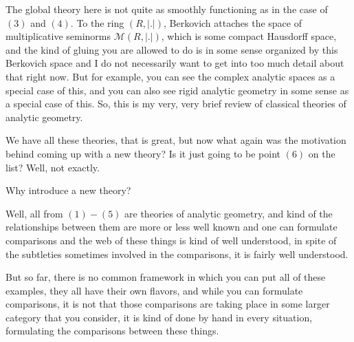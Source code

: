 The global theory here is not quite as smoothly functioning as in the case of $(3)$ and $(4)$. To the ring $(R, |.|)$, Berkovich 
attaches the space of multiplicative seminorms $\mathcal{M}(R, |.|)$, which is some compact Hausdorff space, and  the kind of 
gluing you are allowed to do is in some sense organized by this Berkovich space and I do not necessarily want to get into too much 
detail about that right now. But for example, you can see the complex analytic spaces as a special case of this, and you can also 
see rigid analytic geometry in some sense as a special case of this. So, this is my very, very brief review of classical theories 
of analytic geometry.



We have all these theories, that is  great, but now what again was the motivation behind coming up with a new theory? Is it just going 
to be point $(6)$ on the list? Well, not exactly.

\begin{question}
    Why introduce a new theory?
\end{question}

Well, all from $(1) - (5)$ are theories of analytic geometry, and kind of the relationships between them are more or less well 
known and one can formulate comparisons and the web of these things is kind of well understood, in spite of the subtleties 
sometimes involved in the comparisons, it is fairly well understood.

But so far, there is no common framework in which you can put all of these examples, they all have their own flavors, and while you 
can formulate comparisons, it is not that those comparisons are taking place in some larger category that you consider, 
it is kind of done by hand in every situation, formulating the comparisons between these things.

